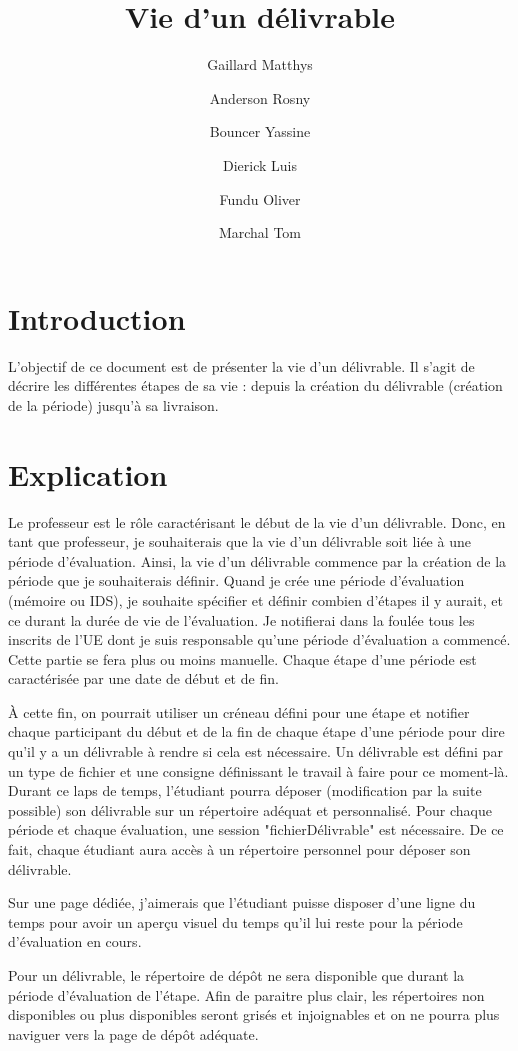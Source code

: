 \documentclass[a4paper,11pt, oneside]{article}
\title{Vie d'un délivrable}
\author{Gaillard Matthys \and Anderson Rosny \and Bouncer Yassine \and Dierick Luis \and Fundu Oliver\and Marchal Tom}
\newcommand{\li}{\newline}
\begin{document}
\maketitle
\section{Introduction}
    \par L'objectif de ce document est de présenter la vie d'un délivrable. Il s'agit de décrire les différentes étapes de sa vie : depuis
    la création du délivrable (création de la période) jusqu'à sa livraison. 
\section{Explication}
    \par Le professeur est le rôle caractérisant le début de la vie d'un délivrable. Donc, en tant que professeur, je 
    souhaiterais que la vie d'un délivrable soit liée à une période d'évaluation. Ainsi, la vie d'un délivrable commence par la création de la période que je souhaiterais définir.
    Quand je crée une période d'évaluation (mémoire ou IDS), je souhaite spécifier et définir combien d'étapes il y aurait, et ce durant la durée de vie de l'évaluation. Je notifierai
    dans la foulée tous les inscrits de l'UE dont je suis responsable qu'une période d'évaluation a commencé. Cette partie se fera plus ou moins manuelle. Chaque étape d'une période est caractérisée par une date de début et de fin.\li

    \par À cette fin, on pourrait utiliser un créneau défini pour une étape et notifier chaque participant du début et de la fin de chaque étape d'une période pour dire qu'il y a un délivrable à rendre si cela est nécessaire.
    Un délivrable est défini par un type de fichier et une consigne définissant le travail à faire pour ce moment-là. Durant ce laps de temps, l'étudiant pourra déposer (modification par la suite possible) son délivrable sur un répertoire adéquat et personnalisé. Pour chaque période et chaque évaluation, 
    une session "fichierDélivrable" est nécessaire. De ce fait, chaque étudiant aura accès à un répertoire personnel pour déposer son délivrable. \li

    \par Sur une page dédiée, j'aimerais que l'étudiant puisse disposer d'une ligne du temps pour avoir un aperçu visuel du temps qu'il lui reste pour la période d'évaluation en cours.\li 

    \par Pour un délivrable, le répertoire de dépôt ne sera disponible que durant la période d'évaluation de l'étape. Afin de paraitre plus clair, les répertoires non disponibles ou plus disponibles seront grisés et injoignables et on ne pourra plus naviguer vers la page de dépôt adéquate.
\end{document}
